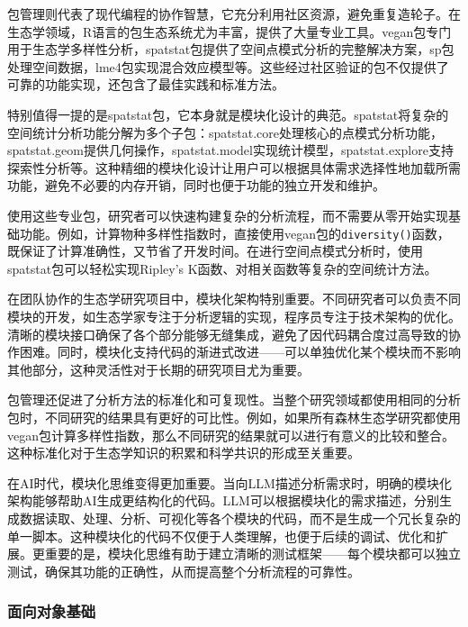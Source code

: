 \documentclass[
  twoside]{book}
\begin{document}
包管理则代表了现代编程的协作智慧，它充分利用社区资源，避免重复造轮子。在生态学领域，R语言的包生态系统尤为丰富，提供了大量专业工具。vegan包专门用于生态学多样性分析，spatstat包提供了空间点模式分析的完整解决方案，sp包处理空间数据，lme4包实现混合效应模型等。这些经过社区验证的包不仅提供了可靠的功能实现，还包含了最佳实践和标准方法。

特别值得一提的是spatstat包，它本身就是模块化设计的典范。spatstat将复杂的空间统计分析功能分解为多个子包：spatstat.core处理核心的点模式分析功能，spatstat.geom提供几何操作，spatstat.model实现统计模型，spatstat.explore支持探索性分析等。这种精细的模块化设计让用户可以根据具体需求选择性地加载所需功能，避免不必要的内存开销，同时也便于功能的独立开发和维护。

使用这些专业包，研究者可以快速构建复杂的分析流程，而不需要从零开始实现基础功能。例如，计算物种多样性指数时，直接使用vegan包的\texttt{diversity()}函数，既保证了计算准确性，又节省了开发时间。在进行空间点模式分析时，使用spatstat包可以轻松实现Ripley's K函数、对相关函数等复杂的空间统计方法。

在团队协作的生态学研究项目中，模块化架构特别重要。不同研究者可以负责不同模块的开发，如生态学家专注于分析逻辑的实现，程序员专注于技术架构的优化。清晰的模块接口确保了各个部分能够无缝集成，避免了因代码耦合度过高导致的协作困难。同时，模块化支持代码的渐进式改进------可以单独优化某个模块而不影响其他部分，这种灵活性对于长期的研究项目尤为重要。

包管理还促进了分析方法的标准化和可复现性。当整个研究领域都使用相同的分析包时，不同研究的结果具有更好的可比性。例如，如果所有森林生态学研究都使用vegan包计算多样性指数，那么不同研究的结果就可以进行有意义的比较和整合。这种标准化对于生态学知识的积累和科学共识的形成至关重要。

在AI时代，模块化思维变得更加重要。当向LLM描述分析需求时，明确的模块化架构能够帮助AI生成更结构化的代码。LLM可以根据模块化的需求描述，分别生成数据读取、处理、分析、可视化等各个模块的代码，而不是生成一个冗长复杂的单一脚本。这种模块化的代码不仅便于人类理解，也便于后续的调试、优化和扩展。更重要的是，模块化思维有助于建立清晰的测试框架------每个模块都可以独立测试，确保其功能的正确性，从而提高整个分析流程的可靠性。

\hypertarget{ux9762ux5411ux5bf9ux8c61ux57faux7840}{%
\subsubsection{面向对象基础}\label{ux9762ux5411ux5bf9ux8c61ux57faux7840}}
\end{document}
